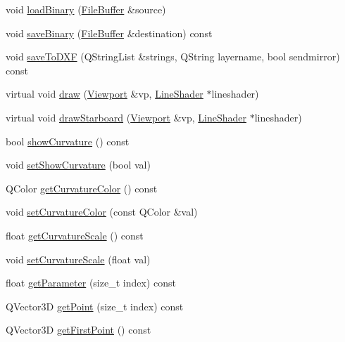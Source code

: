 \begin{DoxyCompactItemize}
\item 
void \hyperlink{classShipCAD_1_1Spline_ae90c8807fb8058d6309f47db64e2d40e}{load\+Binary} (\hyperlink{classShipCAD_1_1FileBuffer}{File\+Buffer} \&source)
\item 
void \hyperlink{classShipCAD_1_1Spline_a5abb8df513d25abe8b0ec000a7926a66}{save\+Binary} (\hyperlink{classShipCAD_1_1FileBuffer}{File\+Buffer} \&destination) const 
\item 
void \hyperlink{classShipCAD_1_1Spline_a33a6300e79043b2fee45cb0eca0696bb}{save\+To\+D\+XF} (Q\+String\+List \&strings, Q\+String layername, bool sendmirror) const 
\item 
virtual void \hyperlink{classShipCAD_1_1Spline_a6424ed433d241f566c15891cc25a74dd}{draw} (\hyperlink{classShipCAD_1_1Viewport}{Viewport} \&vp, \hyperlink{classShipCAD_1_1LineShader}{Line\+Shader} $\ast$lineshader)
\item 
virtual void \hyperlink{classShipCAD_1_1Spline_aa1dcf2a9cff6d17afd926219e3791f9f}{draw\+Starboard} (\hyperlink{classShipCAD_1_1Viewport}{Viewport} \&vp, \hyperlink{classShipCAD_1_1LineShader}{Line\+Shader} $\ast$lineshader)
\item 
bool \hyperlink{classShipCAD_1_1Spline_a2b6fa67f7463838ab2ee9d7b8381a9c5}{show\+Curvature} () const 
\item 
void \hyperlink{classShipCAD_1_1Spline_aae0f5ce3bc2aa58759abd32f3462bf16}{set\+Show\+Curvature} (bool val)
\item 
Q\+Color \hyperlink{classShipCAD_1_1Spline_a788c76b36b091f3d5b92c9cde414cb89}{get\+Curvature\+Color} () const 
\item 
void \hyperlink{classShipCAD_1_1Spline_ac40c22712433f98d657ecaed459d03a0}{set\+Curvature\+Color} (const Q\+Color \&val)
\item 
float \hyperlink{classShipCAD_1_1Spline_af82a5bc6171a9252de5e4c74bf1288e5}{get\+Curvature\+Scale} () const 
\item 
void \hyperlink{classShipCAD_1_1Spline_a17ba0378bfd4a39b4d96d914332c26e4}{set\+Curvature\+Scale} (float val)
\item 
float \hyperlink{classShipCAD_1_1Spline_a81c3cc38d6e70f968b53066bc98e1e01}{get\+Parameter} (size\+\_\+t index) const 
\item 
Q\+Vector3D \hyperlink{classShipCAD_1_1Spline_a04a94537b420a8d19dc5f78526e9a825}{get\+Point} (size\+\_\+t index) const 
\item 
Q\+Vector3D \hyperlink{classShipCAD_1_1Spline_aadd67f56435eea8bb6c74c3aa073c21d}{get\+First\+Point} () const 
\item 

\end{DoxyCompactItemize}
